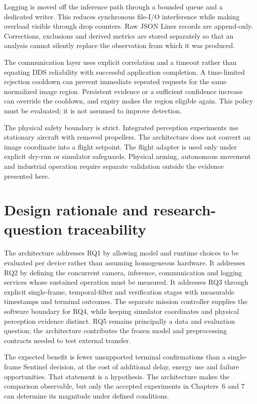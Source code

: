 Logging is moved off the inference path through a bounded queue and a dedicated
writer. This reduces synchronous file-I/O interference while making overload
visible through drop counters. Raw JSON Lines records are append-only.
Corrections, exclusions and derived metrics are stored separately so that an
analysis cannot silently replace the observation from which it was produced.

The communication layer uses explicit correlation and a timeout rather than
equating DDS reliability with successful application completion. A time-limited
rejection cooldown can prevent immediate repeated requests for the same
normalized image region. Persistent evidence or a sufficient confidence
increase can override the cooldown, and expiry makes the region eligible
again. This policy must be evaluated; it is not assumed to improve detection.

The physical safety boundary is strict. Integrated perception experiments use
stationary aircraft with removed propellers. The architecture does not convert
an image coordinate into a flight setpoint. The flight adapter is used only
under explicit dry-run or simulator safeguards. Physical arming, autonomous
movement and industrial operation require separate validation outside the
evidence presented here.

\section{Design rationale and research-question traceability}
\label{sec:architecture:rationale}

The architecture addresses RQ1 by allowing model and runtime choices to be
evaluated per device rather than assuming homogeneous hardware. It addresses
RQ2 by defining the concurrent camera, inference, communication and logging
services whose sustained operation must be measured. It addresses RQ3 through
explicit single-frame, temporal-filter and verification stages with measurable
timestamps and terminal outcomes. The separate mission controller supplies the
software boundary for RQ4, while keeping simulator coordinates and physical
perception evidence distinct. RQ5 remains principally a data and evaluation
question; the architecture contributes the frozen model and preprocessing
contracts needed to test external transfer.

The expected benefit is fewer unsupported terminal confirmations than a
single-frame Sentinel decision, at the cost of additional delay, energy use and
failure opportunities. That statement is a hypothesis. The architecture makes
the comparison observable, but only the accepted experiments in Chapters~6
and 7 can determine its magnitude under defined conditions.

